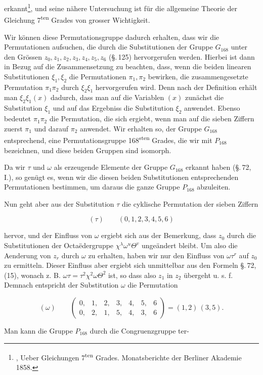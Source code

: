  erkannt\footnote{, \glqq Ueber Gleichungen 7\textsuperscript{ten} Grades\grqq{}. Monatsberichte der Berliner Akademie 1858.}, und seine nähere Untersuchung ist für die allgemeine Theorie der Gleichung 7\textsuperscript{ten} Grades von grosser Wichtigkeit.

Wir können diese Permutationsgruppe dadurch erhalten, dass wir die Permutationen aufsuchen, die durch die Substitutionen der Gruppe $G_{168}$ unter den Grössen $z_0, z_1, z_2, z_3, z_4, z_5, z_6$ (\S.\,125) hervorgerufen werden. Hierbei ist dann in Bezug auf die Zusammensetzung zu beachten, dass, wenn die beiden linearen Substitutionen $\xi_1, \xi_2$ die Permutationen $\pi_1, \pi_2$ bewirken, die zusammengesetzte Permutation $\pi_1 \pi_2$ durch $\xi_2 \xi_1$ hervorgerufen wird. Denn nach der Definition erhält man $\xi_2 \xi_1 (x)$ dadurch, dass man auf die Variablen $(x)$ zunächst die Substitution $\xi_1$ und auf das Ergebniss die Substitution $\xi_2$ anwendet. Ebenso bedeutet $\pi_1 \pi_2$ die Permutation, die sich ergiebt, wenn man auf die sieben Ziffern zuerst $\pi_1$ und darauf $\pi_2$ anwendet. Wir erhalten so, der Gruppe $G_{168}$ entsprechend, eine Permutationsgruppe 168\textsuperscript{sten} Grades, die wir mit $P_{168}$ bezeichnen, und diese beiden Gruppen sind isomorph.

Da wir $\tau$ und $\omega$ als erzeugende Elemente der Gruppe $G_{168}$ erkannt haben (\S.\,72, I.), so genügt es, wenn wir die diesen beiden Substitutionen entsprechenden Permutationen bestimmen, um daraus die ganze Gruppe $P_{168}$ abzuleiten.

Nun geht aber aus der Substitution $\tau$ die cyklische Permutation der sieben Ziffern

\[
(\tau) \qquad (0, 1, 2, 3, 4, 5, 6)
\]

hervor, und der Einfluss von $\omega$ ergiebt sich aus der Bemerkung, dass $z_0$ durch die Substitutionen der Octa\"edergruppe $\chi^\lambda \omega^u \Theta^v$ ungeändert bleibt. Um also die Aenderung von $z_r$ durch $\omega$ zu erhalten, haben wir nur den Einfluss von $\omega \tau^r$ auf $z_0$ zu ermitteln. Dieser Einfluss aber ergiebt sich unmittelbar aus den Formeln \S.\,72, (15), wonach z. B. $\omega \tau = \tau^2 \chi^2 \omega \Theta^2$ ist, so dass also $z_1$ in $z_2$ übergeht u. s. f. Demnach entspricht der Substitution $\omega$ die Permutation

\[
(\omega) \qquad \begin{pmatrix} 0, & 1, & 2, & 3, & 4, & 5, & 6 \\ 0, & 2, & 1, & 5, & 4, & 3, & 6 \end{pmatrix} = (1, 2)\,(3, 5).
\]

Man kann die Gruppe $P_{168}$ durch die Congruenzgruppe ter-
